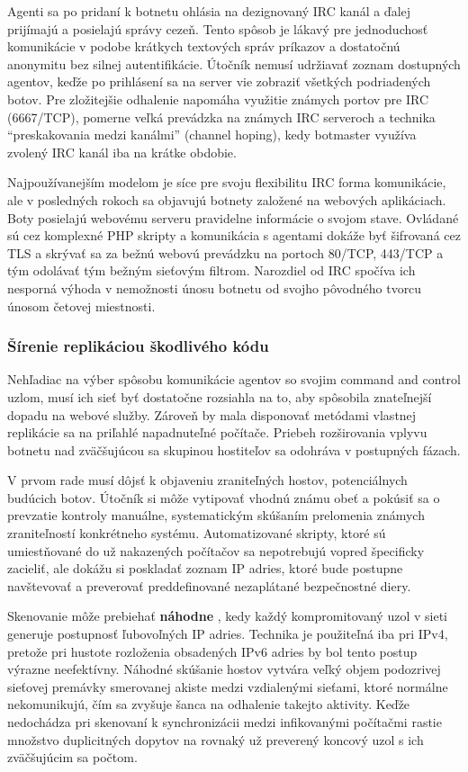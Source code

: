 \documentclass[12pt, a4paper]{article}
\begin{document}
Agenti sa po pridaní k botnetu ohlásia na dezignovaný IRC kanál a ďalej prijímajú a posielajú správy 
cezeň. Tento spôsob je lákavý pre jednoduchosť komunikácie v podobe krátkych textových správ príkazov a 
dostatočnú anonymitu bez silnej autentifikácie. Útočník nemusí udržiavať zoznam dostupných agentov, keďže po 
prihlásení sa na server vie zobraziť všetkých podriadených botov. Pre zložitejšie odhalenie napomáha 
využitie známych portov pre IRC (6667/TCP), pomerne veľká prevádzka na známych IRC serveroch a technika 
\enquote{preskakovania medzi kanálmi} (channel hoping), kedy botmaster využíva zvolený IRC kanál iba na 
krátke obdobie.

Najpoužívanejším modelom je síce pre svoju flexibilitu IRC forma komunikácie, ale v posledných rokoch sa 
objavujú botnety založené na webových aplikáciach. Boty posielajú webovému serveru pravidelne informácie o 
svojom stave. Ovládané sú cez komplexné PHP skripty a komunikácia s agentami dokáže byť šifrovaná cez TLS a 
skrývať sa za bežnú webovú prevádzku na portoch 80/TCP, 443/TCP a tým odolávať tým bežným sieťovým filtrom. 
Narozdiel od IRC spočíva ich nesporná výhoda v nemožnosti únosu botnetu od svojho pôvodného tvorcu únosom 
četovej miestnosti.

\subsubsection{Šírenie replikáciou škodlivého kódu}
Nehľadiac na výber spôsobu komunikácie agentov so svojim command and control uzlom, musí ich sieť byť 
dostatočne rozsiahla na to, aby spôsobila znateľnejší dopadu na webové služby. Zároveň by mala disponovať 
metódami vlastnej replikácie sa na priľahlé napadnuteľné počítače. Priebeh rozširovania vplyvu botnetu
nad zväčšujúcou sa skupinou hostiteľov sa odohráva v postupných fázach. 

V prvom rade musí dôjsť k objaveniu zraniteľných hostov, potenciálnych budúcich botov. Útočník si
môže vytipovať vhodnú známu obeť a pokúsiť sa o prevzatie kontroly manuálne, systematickým skúšaním
prelomenia známych zraniteľností konkrétneho systému. Automatizované skripty, ktoré sú umiestňované do už 
nakazených počítačov sa nepotrebujú vopred špecificky zacieliť, ale dokážu si poskladať zoznam IP adries, 
ktoré bude postupne navštevovať a preverovať preddefinované nezaplátané bezpečnostné diery. 

Skenovanie môže prebiehať \textbf{náhodne} \cite{ddos-anatomy-2004}, kedy každý kompromitovaný uzol v sieti 
generuje postupnosť ľubovoľných IP adries. Technika je použiteľná iba pri IPv4, pretože pri hustote 
rozloženia obsadených IPv6 adries by bol tento postup výrazne neefektívny. Náhodné skúšanie hostov
vytvára veľký objem podozrivej sieťovej premávky smerovanej akiste medzi vzdialenými sieťami, 
ktoré normálne nekomunikujú, čím sa zvyšuje šanca na odhalenie takejto aktivity. Keďže nedochádza 
pri skenovaní k synchronizácii medzi infikovanými počítačmi rastie množstvo duplicitných dopytov
na rovnaký už preverený koncový uzol s ich zväčšujúcim sa počtom.
\end{document}
